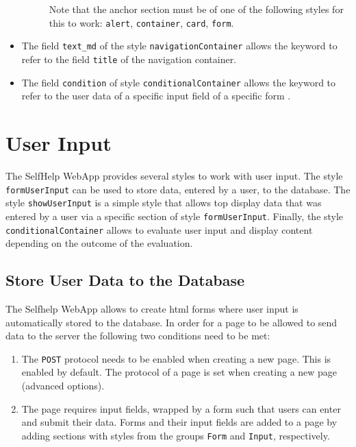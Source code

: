 \documentclass[a4paper,oneside]{book}
\begin{document}
\begin{itemize}
\begin{description}
                Note that the anchor section must be of one of the following styles for this to work: \texttt{alert}, \texttt{container}, \texttt{card}, \texttt{form}.
        \end{description}
    \item The field \texttt{text\_md} of the style \texttt{navigationContainer} allows the keyword  to refer to the field \texttt{title} of the navigation container.
    \item The field \texttt{condition} of style \texttt{conditionalContainer} allows the keyword  to refer to the user data of a specific input field  of a specific form .
\end{itemize}

\chapter{User Input}\label{sec.user_input}

The SelfHelp WebApp provides several styles to work with user input.
The style \texttt{formUserInput} can be used to store data, entered by a user, to the database.
The style \texttt{showUserInput} is a simple style that allows top display data that was entered by a user via a specific section of style \texttt{formUserInput}.
Finally, the style \texttt{conditionalContainer} allows to evaluate user input and display content depending on the outcome of the evaluation.

\section{Store User Data to the Database}
The Selfhelp WebApp allows to create html forms where user input is automatically stored to the database.
In order for a page to be allowed to send data to the server the following two conditions need to be met:
\begin{enumerate}
    \item The \texttt{POST} protocol needs to be enabled when creating a new page.
        This is enabled by default.
        The protocol of a page is set when creating a new page (advanced options).
    \item The page requires input fields, wrapped by a form such that users can enter and submit their data.
        Forms and their input fields are added to a page by adding sections with styles from the groups \texttt{Form} and \texttt{Input}, respectively.
\end{enumerate}
\end{document}
